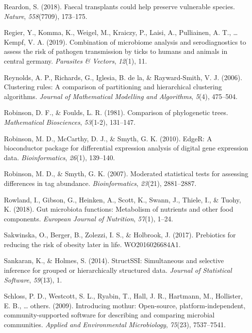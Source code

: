 \documentclass[12pt,a4paper]{reedthesis}
\theoremstyle{definition}
\theoremstyle{definition}
\theoremstyle{definition}
\theoremstyle{remark}
\begin{document}
\leavevmode\hypertarget{ref-reardon2018faecal}{}%
Reardon, S. (2018). Faecal transplants could help preserve vulnerable species. \emph{Nature}, \emph{558}(7709), 173--175.

\leavevmode\hypertarget{ref-regier2019combination}{}%
Regier, Y., Komma, K., Weigel, M., Kraiczy, P., Laisi, A., Pulliainen, A. T., \ldots{} Kempf, V. A. (2019). Combination of microbiome analysis and serodiagnostics to assess the risk of pathogen transmission by ticks to humans and animals in central germany. \emph{Parasites \& Vectors}, \emph{12}(1), 11.

\leavevmode\hypertarget{ref-reynolds2006clustering}{}%
Reynolds, A. P., Richards, G., Iglesia, B. de la, \& Rayward-Smith, V. J. (2006). Clustering rules: A comparison of partitioning and hierarchical clustering algorithms. \emph{Journal of Mathematical Modelling and Algorithms}, \emph{5}(4), 475--504.

\leavevmode\hypertarget{ref-robinson1981comparison}{}%
Robinson, D. F., \& Foulds, L. R. (1981). Comparison of phylogenetic trees. \emph{Mathematical Biosciences}, \emph{53}(1-2), 131--147.

\leavevmode\hypertarget{ref-robinson2010edger}{}%
Robinson, M. D., McCarthy, D. J., \& Smyth, G. K. (2010). EdgeR: A bioconductor package for differential expression analysis of digital gene expression data. \emph{Bioinformatics}, \emph{26}(1), 139--140.

\leavevmode\hypertarget{ref-robinson2007moderated}{}%
Robinson, M. D., \& Smyth, G. K. (2007). Moderated statistical tests for assessing differences in tag abundance. \emph{Bioinformatics}, \emph{23}(21), 2881--2887.

\leavevmode\hypertarget{ref-rowland2018gut}{}%
Rowland, I., Gibson, G., Heinken, A., Scott, K., Swann, J., Thiele, I., \& Tuohy, K. (2018). Gut microbiota functions: Metabolism of nutrients and other food components. \emph{European Journal of Nutrition}, \emph{57}(1), 1--24.

\leavevmode\hypertarget{ref-sakwinska2017prebiotics}{}%
Sakwinska, O., Berger, B., Zolezzi, I. S., \& Holbrook, J. (2017). Prebiotics for reducing the risk of obesity later in life. WO2016026684A1.

\leavevmode\hypertarget{ref-sankaran2014structssi}{}%
Sankaran, K., \& Holmes, S. (2014). StructSSI: Simultaneous and selective inference for grouped or hierarchically structured data. \emph{Journal of Statistical Software}, \emph{59}(13), 1.

\leavevmode\hypertarget{ref-schloss2009introducing}{}%
Schloss, P. D., Westcott, S. L., Ryabin, T., Hall, J. R., Hartmann, M., Hollister, E. B., \ldots{} others. (2009). Introducing mothur: Open-source, platform-independent, community-supported software for describing and comparing microbial communities. \emph{Applied and Environmental Microbiology}, \emph{75}(23), 7537--7541.
\end{document}
